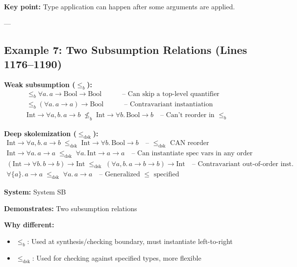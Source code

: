 \documentclass[11pt,a4paper]{article}
\begin{document}
\textbf{Key point:} Type application can happen after some arguments are applied.

---

\subsection{Example 7: Two Subsumption Relations (Lines 1176--1190)}

\textbf{Weak subsumption ($\leq_b$):}
\[
\begin{array}{l}
\leq_b \forall a.\, a \to \text{Bool} \to \text{Bool} \quad\quad\quad \text{-- Can skip a top-level quantifier} \\[4pt]
\leq_b (\forall a.\, a \to a) \to \text{Bool} \quad\quad\quad \text{-- Contravariant instantiation} \\[4pt]
\text{Int} \to \forall a, b.\, a \to b \;\not\leq_b\; \text{Int} \to \forall b.\, \text{Bool} \to b \quad \text{-- Can't reorder in } \leq_b
\end{array}
\]

\textbf{Deep skolemization ($\leq_{\text{dsk}}$):}
\[
\begin{array}{l}
\text{Int} \to \forall a, b.\, a \to b \;\leq_{\text{dsk}}\; \text{Int} \to \forall b.\, \text{Bool} \to b \quad \text{-- } \leq_{\text{dsk}} \text{ CAN reorder} \\[4pt]
\text{Int} \to \forall a.\, a \to a \;\leq_{\text{dsk}}\; \forall a.\, \text{Int} \to a \to a \quad \text{-- Can instantiate spec vars in any order} \\[4pt]
(\text{Int} \to \forall b.\, b \to b) \to \text{Int} \;\leq_{\text{dsk}}\; (\forall a, b.\, a \to b \to b) \to \text{Int} \quad \text{-- Contravariant out-of-order inst.} \\[4pt]
\forall \{a\}.\, a \to a \;\leq_{\text{dsk}}\; \forall a.\, a \to a \quad \text{-- Generalized } \leq \text{ specified}
\end{array}
\]

\textbf{System:} System SB

\textbf{Demonstrates:} Two subsumption relations

\textbf{Why different:}
\begin{itemize}
\item $\leq_b$: Used at synthesis/checking boundary, must instantiate left-to-right
\item $\leq_{\text{dsk}}$: Used for checking against specified types, more flexible
\end{itemize}
\end{document}
